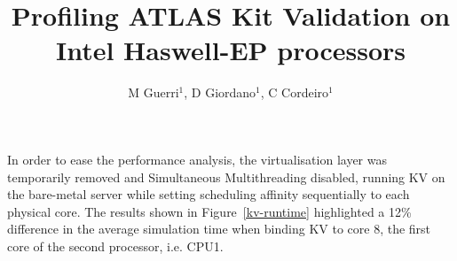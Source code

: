 \documentclass[a4paper]{jpconf}
\begin{document}
\title{Profiling ATLAS Kit Validation on \newline Intel Haswell-EP processors}

\author{M Guerri$^1$, D Giordano$^1$, C Cordeiro$^1$}
\address{$^1$ CERN}

\newcommand\realnumberstyle[1]{}

\makeatletter
\newcommand{\zebra}[3]{%
    {\realnumberstyle{#3}}%
    \begingroup
    \lst@basicstyle
    \ifodd\value{lstnumber}%
        \color{#1}%
    \else
        \color{#2}%
    \fi
        \rlap{\hspace*{\lst@numbersep}%
        \color@block{\linewidth}{\ht\strutbox}{\dp\strutbox}%
        }%
    \endgroup
}
\makeatother




In order to ease the performance analysis, the virtualisation layer was
temporarily removed and Simultaneous Multithreading disabled, running KV on 
the bare-metal server while setting scheduling affinity sequentially to each physical
core. The results shown
in Figure~\ref{kv-runtime} highlighted a 12\% difference in the average simulation
time when binding KV to core 8, the first core of the second processor, i.e. CPU1.
\end{document}

